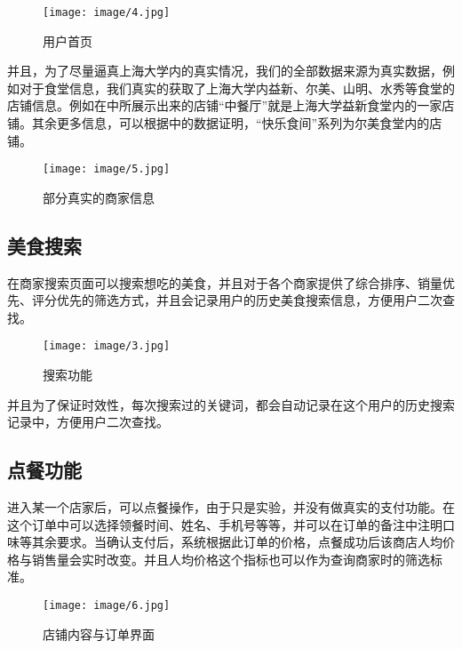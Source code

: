 \documentclass[lang=cn,a4paper,chinesefont=founder,bibend=bibtex]{shu-lab-report}
\begin{document}
\begin{figure}[htbp]
  \centering
  \texttt{[image: image/4.jpg]}
  \caption{用户首页}
  \label{fig:4}
\end{figure}

并且，为了尽量逼真上海大学内的真实情况，我们的全部数据来源为真实数据，例如对于食堂信息，我们真实的获取了上海大学内益新、尔美、山明、水秀等食堂的店铺信息。例如在中所展示出来的店铺“中餐厅”就是上海大学益新食堂内的一家店铺。其余更多信息，可以根据中的数据证明，“快乐食间”系列为尔美食堂内的店铺。

\begin{figure}[htbp]
  \centering
  \texttt{[image: image/5.jpg]}
  \caption{部分真实的商家信息}
  \label{fig:5}
\end{figure}

\newpage

\subsection{美食搜索}

在商家搜索页面可以搜索想吃的美食，并且对于各个商家提供了综合排序、销量优先、评分优先的筛选方式，并且会记录用户的历史美食搜索信息，方便用户二次查找。

\begin{figure}[htbp]
  \centering
  \texttt{[image: image/3.jpg]}
  \caption{搜索功能}
  \label{fig:3}
\end{figure}

并且为了保证时效性，每次搜索过的关键词，都会自动记录在这个用户的历史搜索记录中，方便用户二次查找。

\newpage

\subsection{点餐功能}

进入某一个店家后，可以点餐操作，由于只是实验，并没有做真实的支付功能。在这个订单中可以选择领餐时间、姓名、手机号等等，并可以在订单的备注中注明口味等其余要求。当确认支付后，系统根据此订单的价格，点餐成功后该商店人均价格与销售量会实时改变。并且人均价格这个指标也可以作为查询商家时的筛选标准。

\begin{figure}[htbp]
  \centering
  \texttt{[image: image/6.jpg]}
  \caption{店铺内容与订单界面}
\end{figure}
\end{document}

